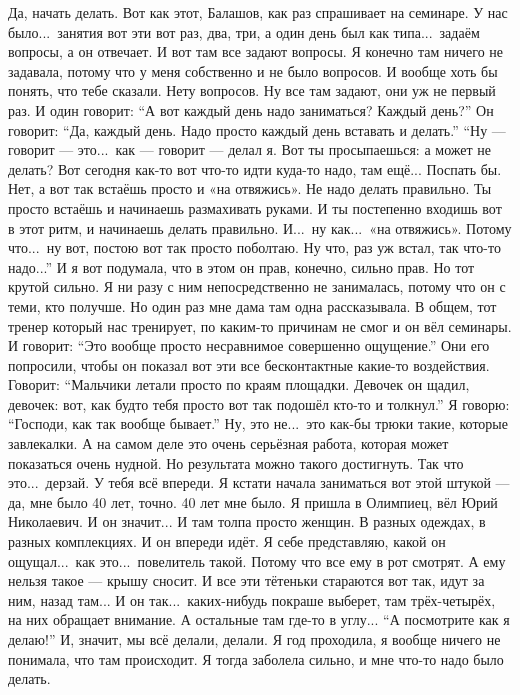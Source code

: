 \M
Да, начать делать.
Вот как этот, Балашов, как раз спрашивает на семинаре.
У нас было...\ занятия вот эти вот раз, два, три, а один день был как типа...\
задаём вопросы, а он отвечает.
И вот там все задают вопросы.
Я конечно там ничего не задавала, потому что у меня собственно и не было вопросов.
И вообще хоть бы понять, что тебе сказали. Нету вопросов.
Ну все там задают, они уж не первый раз.
И один говорит: ``А вот каждый день надо заниматься?
Каждый день?'' Он говорит: ``Да, каждый день.
Надо просто каждый день вставать и делать.''
``Ну --- говорит --- это...\
как --- говорит --- делал я.
Вот ты просыпаешься: а может не делать?
Вот сегодня как-то вот что-то идти куда-то надо, там ещё...
Поспать бы.
Нет, а вот так встаёшь просто и «на отвяжись».
Не надо делать правильно.
Ты просто встаёшь и начинаешь размахивать руками.
И ты постепенно входишь вот в этот ритм,
и начинаешь делать правильно.
И...\ ну как...\ «на отвяжись».
Потому что...\ ну вот, постою вот так просто поболтаю.
Ну что, раз уж встал, так что-то надо...''
И я вот подумала, что в этом он прав, конечно, сильно прав.
Но тот крутой сильно.
Я ни разу с ним непосредственно не занималась, потому что он
с теми, кто получше.
Но один раз мне дама там одна рассказывала.
В общем, тот тренер который нас тренирует, по каким-то причинам не смог и он вёл семинары.
И говорит: ``Это вообще просто несравнимое совершенно ощущение.''
Они его попросили, чтобы он показал вот эти все бесконтактные какие-то воздействия.
Говорит: ``Мальчики летали просто по краям площадки.
Девочек он щадил, девочек: вот, как будто тебя просто вот так подошёл кто-то и толкнул.''
Я говорю: ``Господи, как так вообще бывает.''
Ну, это не...\ это как-бы трюки такие, которые завлекалки.
А на самом деле это очень серьёзная работа, которая может показаться очень нудной.
Но результата можно такого достигнуть.
Так что это...\ дерзай.
У тебя всё впереди.
Я кстати начала заниматься вот этой штукой --- да, мне было 40 лет, точно.
40 лет мне было. Я пришла в Олимпиец, вёл Юрий Николаевич.
И он значит...
И там толпа просто женщин.
В разных одеждах, в разных комплекциях.
И он впереди идёт.
Я себе представляю, какой он ощущал...\ как это...\ повелитель такой.
Потому что все ему в рот смотрят.
А ему нельзя такое --- крышу сносит.
И все эти тётеньки стараются вот так, идут за ним, назад там...
И он так...\ каких-нибудь покраше выберет, там трёх-четырёх, на них обращает внимание.
А остальные там где-то в углу... ``А посмотрите как я делаю!''
И, значит, мы всё делали, делали. Я год проходила, я вообще ничего не понимала, что там происходит.
Я тогда заболела сильно, и мне что-то надо было делать.

